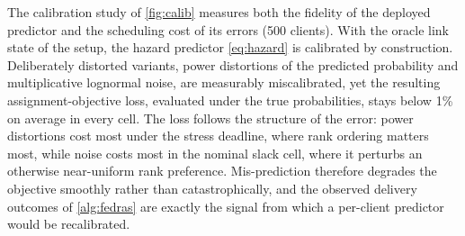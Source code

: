 \documentclass[a4paper,fleqn]{cas-dc}
\begin{document}
\par
The calibration study of \cref{fig:calib} measures both the fidelity of the deployed predictor and the scheduling cost of its errors (500 clients). With the oracle link state of the setup, the hazard predictor \cref{eq:hazard} is calibrated by construction. Deliberately distorted variants, power distortions of the predicted probability and multiplicative lognormal noise, are measurably miscalibrated, yet the resulting assignment-objective loss, evaluated under the true probabilities, stays below 1\% on average in every cell. The loss follows the structure of the error: power distortions cost most under the stress deadline, where rank ordering matters most, while noise costs most in the nominal slack cell, where it perturbs an otherwise near-uniform rank preference. Mis-prediction therefore degrades the objective smoothly rather than catastrophically, and the observed delivery outcomes of \cref{alg:fedras} are exactly the signal from which a per-client predictor would be recalibrated.
\par

\par
\end{document}
